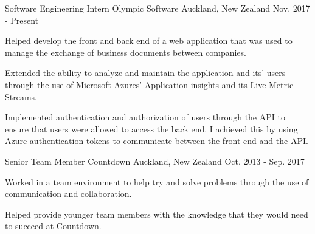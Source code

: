 \begin{cventries}
  \cventry
    {Software Engineering Intern}
    {Olympic Software}
    {Auckland, New Zealand}
    {Nov. 2017 - Present}
    {
      \begin{cvitems}
        \item {Helped develop the front and back end of a web application that was used to manage the exchange of business documents between companies.}
        \item {Extended the ability to analyze and maintain the application and its' users through the use of Microsoft Azures' Application insights and its Live Metric Streams.}
        \item {Implemented authentication and authorization of users through the API to ensure that users were allowed to access the back end. I achieved this by using Azure authentication tokens to communicate between the front end and the API.}
      \end{cvitems}
    }
  \cventry
    {Senior Team Member}
    {Countdown}
    {Auckland, New Zealand}
    {Oct. 2013 - Sep. 2017}
    {
      \begin{cvitems}
        \item {Worked in a team environment to help try and solve problems through the use of communication and collaboration.}
        \item {Helped provide younger team members with the knowledge that they would need to succeed at Countdown.}
      \end{cvitems}
    }
\end{cventries}
\vspace{-5pt}
